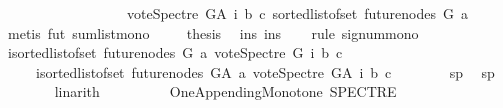\begin{isabellebody}
\ \ \ \ \ \ \ \ \ \ \ \ \ \ \ \ \ \ {\isacharparenleft}{\kern0pt}vote{\isacharunderscore}{\kern0pt}Spectre\ G{\isacharunderscore}{\kern0pt}A\ i\ b\ c{\isacharparenright}{\kern0pt}{\isacharparenright}{\kern0pt}\ {\isacharparenleft}{\kern0pt}sorted{\isacharunderscore}{\kern0pt}list{\isacharunderscore}{\kern0pt}of{\isacharunderscore}{\kern0pt}set\ {\isacharparenleft}{\kern0pt}future{\isacharunderscore}{\kern0pt}nodes\ G\ a{\isacharparenright}{\kern0pt}{\isacharparenright}{\kern0pt}{\isacharparenright}{\kern0pt}{\isachardoublequoteclose}\isanewline
\ \ \ \ \isamarkupfalse%
\ {\isacharparenleft}{\kern0pt}metis\ fut\ sum{\isacharunderscore}{\kern0pt}list{\isacharunderscore}{\kern0pt}mono\ {\isacharparenright}{\kern0pt}\isanewline
\ \ \isamarkupfalse%
\ {\isacharquery}{\kern0pt}thesis\ \isamarkupfalse%
\ ins\ ins{}\isanewline
\ \ \isamarkupfalse%
\ {\isacharparenleft}{\kern0pt}rule\ signum{\isacharunderscore}{\kern0pt}mono{\isacharparenright}{\kern0pt}\isanewline
\ \ \ \ \isamarkupfalse%
\ {\isachardoublequoteopen}{\isacharparenleft}{\kern0pt}{\isasymSum}i{\isasymleftarrow}sorted{\isacharunderscore}{\kern0pt}list{\isacharunderscore}{\kern0pt}of{\isacharunderscore}{\kern0pt}set\ {\isacharparenleft}{\kern0pt}future{\isacharunderscore}{\kern0pt}nodes\ G\ a{\isacharparenright}{\kern0pt}{\isachardot}{\kern0pt}\ vote{\isacharunderscore}{\kern0pt}Spectre\ G\ i\ b\ c{\isacharparenright}{\kern0pt}\isanewline
\ \ \ \ {\isasymle}\ {\isacharparenleft}{\kern0pt}{\isasymSum}i{\isasymleftarrow}sorted{\isacharunderscore}{\kern0pt}list{\isacharunderscore}{\kern0pt}of{\isacharunderscore}{\kern0pt}set\ {\isacharparenleft}{\kern0pt}future{\isacharunderscore}{\kern0pt}nodes\ G{\isacharunderscore}{\kern0pt}A\ a{\isacharparenright}{\kern0pt}{\isachardot}{\kern0pt}\ vote{\isacharunderscore}{\kern0pt}Spectre\ G{\isacharunderscore}{\kern0pt}A\ i\ b\ c{\isacharparenright}{\kern0pt}{\isachardoublequoteclose}\isanewline
\ \ \ \ \ \ \isamarkupfalse%
\ sp{}\ \isamarkupfalse%
\ sp{}\isanewline
\ \ \ \ \ \ \isamarkupfalse%
\ linarith\ \isanewline
\ \ \ \ \isamarkupfalse%
\isanewline
\ \ \isamarkupfalse%
\isanewline
{}\isamarkupfalse%
%
\endisatagproof
{\isafoldproof}%
%
\isadelimproof
\isanewline
%
\endisadelimproof
\isanewline
{}\isamarkupfalse%
\ {\isachardoublequoteopen}One{\isacharunderscore}{\kern0pt}Appending{\isacharunderscore}{\kern0pt}Monotone\ SPECTRE{\isachardoublequoteclose}\isanewline

\end{isabellebody}

